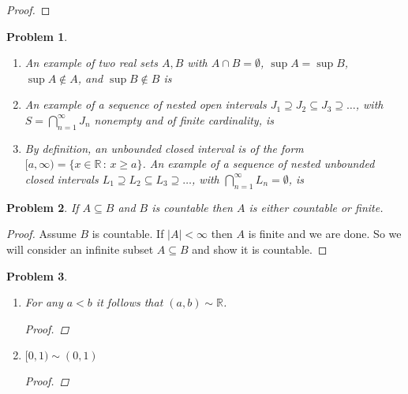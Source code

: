 \documentclass[12pt]{article}
\newtheorem{problem}{Problem}
\newcommand{\II}{\ensuremath{\mathbb I}}
\newcommand{\QQ}{\ensuremath{\mathbb Q}}
\newcommand{\RR}{\ensuremath{\mathbb R}}
\begin{document}
\begin{proof}
\end{proof}


\begin{problem} %
\phantom{foo}

\renewcommand{\labelenumi}{(\alph{enumi})}
\begin{enumerate}
\item An example of two real sets $A,B$ with $A\cap B=\emptyset$, $\sup A = \sup B$, $\sup A \notin A$, and $\sup B \notin B$ is
\item An example of a sequence of nested open intervals $J_1\supseteq J_2 \subseteq J_3 \supseteq \dots$, with $S=\bigcap_{n=1}^\infty J_n$ nonempty and of finite cardinality, is
\item By definition, an unbounded closed interval is of the form $[a,\infty) = \{x\in\RR \,:\, x \ge a\}$.  An example of a sequence of nested unbounded closed intervals $L_1\supseteq L_2 \subseteq L_3 \supseteq \dots$, with $\bigcap_{n=1}^\infty L_n = \emptyset$, is
\end{enumerate}
\end{problem}


\begin{problem} %
If $A\subseteq B$ and $B$ is countable then $A$ is either countable or finite.
\end{problem}


\begin{proof}
Assume $B$ is countable.  If $|A|<\infty$ then $A$ is finite and we are done.  So we will consider an infinite subset $A\subseteq B$ and show it is countable.
\end{proof}


\begin{problem} %
\phantom{foo}

\renewcommand{\labelenumi}{(\alph{enumi})}
\begin{enumerate}
\item For any $a<b$ it follows that $(a,b) \sim \RR$.

\begin{proof}
\end{proof}

\item $[0,1) \sim (0,1)$

\begin{proof}
\end{proof}

\end{enumerate}
\end{problem}
\end{document}
